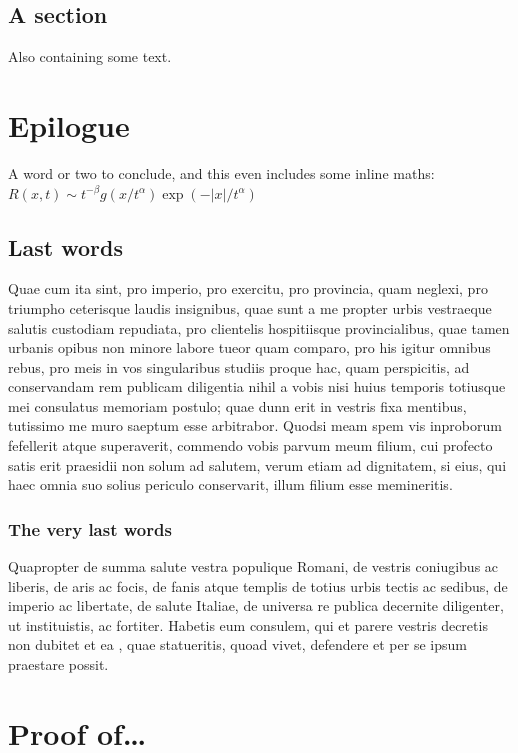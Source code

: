 \documentclass[12pt, a4paper, twoside, english]{report}
\begin{document}
		
	\section{A section}
	Also containing some text.
	
		
	\chapter{Epilogue}
	A word or two to conclude,  and this even includes some
	inline maths: \(R(x,t)\sim
	t^{-\beta}g(x/t^\alpha)\exp(-|x|/t^\alpha)\)
	
	\section{Last words}
	Quae cum ita sint, pro imperio, pro exercitu, pro provincia, quam
	neglexi, pro triumpho ceterisque laudis insignibus, quae sunt a me
	propter urbis vestraeque salutis custodiam repudiata, pro clientelis
	hospitiisque provincialibus, quae tamen urbanis opibus non minore labore
	tueor quam comparo, pro his igitur omnibus rebus, pro meis in vos
	singularibus studiis proque hac, quam perspicitis, ad conservandam rem
	publicam diligentia nihil a vobis nisi huius temporis totiusque mei
	consulatus memoriam postulo; quae dunn erit in vestris fixa mentibus,
	tutissimo me muro saeptum esse arbitrabor. Quodsi meam spem vis
	inproborum fefellerit atque superaverit, commendo vobis parvum meum
	filium, cui profecto satis erit praesidii non solum ad salutem, verum
	etiam ad dignitatem, si eius, qui haec omnia suo solius periculo
	conservarit, illum filium esse memineritis.
	
	\subsection{The very last words}
	Quapropter de summa salute
	vestra populique Romani, de vestris coniugibus ac liberis, de aris ac
	focis, de fanis atque templis de totius urbis tectis ac sedibus, de
	imperio ac libertate, de salute Italiae, de universa re publica
	decernite diligenter, ut instituistis, ac fortiter. Habetis eum
	consulem, qui et parere vestris decretis non dubitet et ea \cite{fortran}, quae
	statueritis, quoad vivet, defendere et per se ipsum praestare possit.
	
	
	
	
	\appendix
	
	\chapter{Proof of\dots}
	\label{app:proof1}
	
\end{document}
